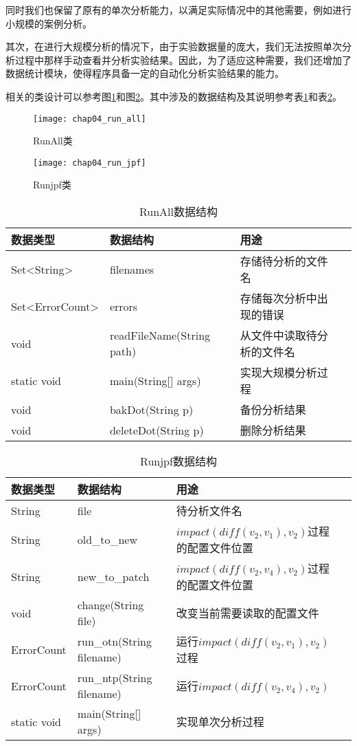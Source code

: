 同时我们也保留了原有的单次分析能力，以满足实际情况中的其他需要，例如进行小规模的案例分析。

其次，在进行大规模分析的情况下，由于实验数据量的庞大，我们无法按照单次分析过程中那样手动查看并分析实验结果。因此，为了适应这种需要，我们还增加了数据统计模块，使得程序具备一定的自动化分析实验结果的能力。

相关的类设计可以参考图\ref {class_run_all}和图\ref {class_run_jpf}。其中涉及的数据结构及其说明参考表\ref {run_all_data}和表\ref {run_jpf_data}。

\begin{figure}[H]
	\centering
	\texttt{[image: chap04\_run\_all]}
	\caption {RunAll类}
	\label {class_run_all}	
\end{figure}

\begin{figure}[H]
	\centering
	\texttt{[image: chap04\_run\_jpf]}
	\caption {Runjpf类}
	\label {class_run_jpf}	
\end{figure}

\begin{table}
	\caption{RunAll数据结构}
	\label{run_all_data}
	\centering
	\begin{tabular}{lllc}
		\toprule[1.5pt]
		{\heiti 数据类型} &{\heiti 数据结构} & {\heiti 用途} \\\midrule[1pt]
		Set<String> & filenames & 存储待分析的文件名 \\
		Set<ErrorCount> & errors & 存储每次分析中出现的错误 \\
		void & readFileName(String path) & 从文件中读取待分析的文件名\\
		static void & main(String[] args) & 实现大规模分析过程\\
		void & bakDot(String p) & 备份分析结果\\
		void & deleteDot(String p) & 删除分析结果\\
		\bottomrule[1.5pt]
	\end{tabular}
\end{table}

\begin{table}
	\caption{Runjpf数据结构}
	\label{run_jpf_data}
	\centering
	\begin{tabular}{lllc}
		\toprule[1.5pt]
		{\heiti 数据类型} &{\heiti 数据结构} & {\heiti 用途} \\\midrule[1pt]
		String & file & 待分析文件名\\
		String & old\_to\_new & $impact(diff(v_2,v_1),v_2)$过程的配置文件位置\\
		String & new\_to\_patch & $impact(diff(v_2,v_4),v_2)$过程的配置文件位置\\
		void & change(String file) & 改变当前需要读取的配置文件\\
		ErrorCount & run\_otn(String filename) & 运行$impact(diff(v_2,v_1),v_2)$过程 \\
		ErrorCount & run\_ntp(String filename) & 运行$impact(diff(v_2,v_4),v_2)$  \\
		static void & main(String[] args) & 实现单次分析过程\\
		\bottomrule[1.5pt]
	\end{tabular}
\end{table}


